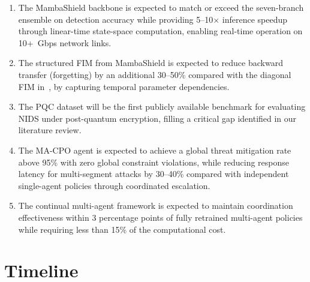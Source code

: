 \documentclass[12pt,a4paper]{article}
\theoremstyle{definition}
\begin{document}
\begin{enumerate}
\item The MambaShield backbone is expected to match or exceed the seven-branch ensemble on detection accuracy while providing 5--10$\times$ inference speedup through linear-time state-space computation, enabling real-time operation on 10+~Gbps network links.

\item The structured FIM from MambaShield is expected to reduce backward transfer (forgetting) by an additional 30--50\% compared with the diagonal FIM in~\cite{anaedevha2026cl_rl}, by capturing temporal parameter dependencies.

\item The PQC dataset will be the first publicly available benchmark for evaluating NIDS under post-quantum encryption, filling a critical gap identified in our literature review.

\item The MA-CPO agent is expected to achieve a global threat mitigation rate above 95\% with zero global constraint violations, while reducing response latency for multi-segment attacks by 30--40\% compared with independent single-agent policies through coordinated escalation.

\item The continual multi-agent framework is expected to maintain coordination effectiveness within 3 percentage points of fully retrained multi-agent policies while requiring less than 15\% of the computational cost.
\end{enumerate}

\section{Timeline}
\label{sec:timeline}
\end{document}
